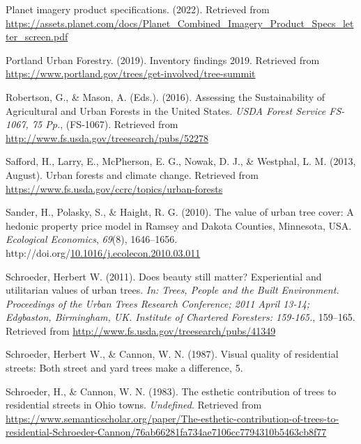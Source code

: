 \documentclass[12pt,twoside]{reedthesis}
\newlength{\cslhangindent}
\newenvironment{CSLReferences}[2] %
 {%
  \setlength{\parindent}{0pt}
  \ifodd #1 \everypar{\setlength{\hangindent}{\cslhangindent}}\ignorespaces\fi
  \ifnum #2 > 0
  \setlength{\parskip}{#2\baselineskip}
  \fi
 }%
 {}
\begin{document}
\begin{CSLReferences}{1}{0}
\leavevmode{}%
Planet imagery product specifications. (2022). Retrieved from \url{https://assets.planet.com/docs/Planet_Combined_Imagery_Product_Specs_letter_screen.pdf}

\leavevmode{}%
Portland Urban Forestry. (2019). Inventory findings 2019. Retrieved from \url{https://www.portland.gov/trees/get-involved/tree-summit}

\leavevmode{}%
Robertson, G., \& Mason, A. (Eds.). (2016). Assessing the Sustainability of Agricultural and Urban Forests in the United States. \emph{USDA Forest Service FS-1067, 75 Pp.}, (FS-1067). Retrieved from \url{http://www.fs.usda.gov/treesearch/pubs/52278}

\leavevmode{}%
Safford, H., Larry, E., McPherson, E. G., Nowak, D. J., \& Westphal, L. M. (2013, August). Urban forests and climate change. Retrieved from \url{https://www.fs.usda.gov/ccrc/topics/urban-forests}

\leavevmode{}%
Sander, H., Polasky, S., \& Haight, R. G. (2010). The value of urban tree cover: A hedonic property price model in Ramsey and Dakota Counties, Minnesota, USA. \emph{Ecological Economics}, \emph{69}(8), 1646--1656. http://doi.org/\href{https://doi.org/10.1016/j.ecolecon.2010.03.011}{10.1016/j.ecolecon.2010.03.011}

\leavevmode{}%
Schroeder, Herbert W. (2011). Does beauty still matter? Experiential and utilitarian values of urban trees. \emph{In: Trees, People and the Built Environment. Proceedings of the Urban Trees Research Conference; 2011 April 13-14; Edgbaston, Birmingham, UK. Institute of Chartered Foresters: 159-165.}, 159--165. Retrieved from \url{http://www.fs.usda.gov/treesearch/pubs/41349}

\leavevmode{}%
Schroeder, Herbert W., \& Cannon, W. N. (1987). Visual quality of residential streets: Both street and yard trees make a difference, 5.

\leavevmode{}%
Schroeder, H., \& Cannon, W. N. (1983). The esthetic contribution of trees to residential streets in Ohio towns. \emph{Undefined}. Retrieved from \url{https://www.semanticscholar.org/paper/The-esthetic-contribution-of-trees-to-residential-Schroeder-Cannon/76ab66281fa734ae7106cc7794310b5463cb8f77}


\end{CSLReferences}
\end{document}
